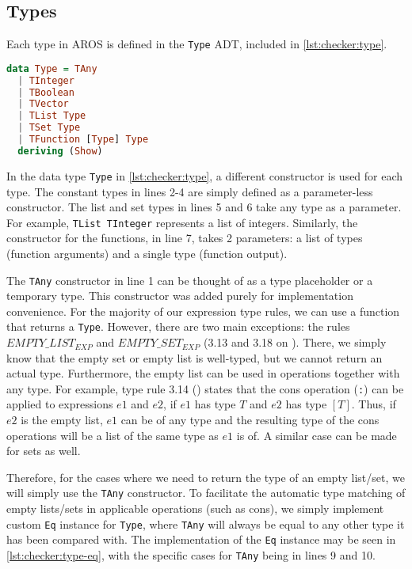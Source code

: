 \subsection{Types}
\label{sec:checker:types}
Each type in AROS is defined in the \lstinline{Type} ADT, included in \cref{lst:checker:type}. 
\begin{lstlisting}[language=haskell,
caption={Data type used to represent types during type checking},
label=lst:checker:type]
data Type = TAny
  | TInteger
  | TBoolean
  | TVector
  | TList Type
  | TSet Type
  | TFunction [Type] Type
  deriving (Show)
\end{lstlisting}
\par In the data type \lstinline{Type} in \cref{lst:checker:type}, a different constructor is used for each type. The constant types in lines 2-4 are simply defined as a parameter-less constructor. The list and set types in lines 5 and 6 take any type as a parameter. For example, \lstinline{TList TInteger} represents a list of integers. Similarly, the constructor for the functions, in line 7, takes 2 parameters: a list of types (function arguments) and a single type (function output).
\par The \lstinline{TAny} constructor in line 1 can be thought of as a type placeholder or a temporary type. This constructor was added purely for implementation convenience. For the majority of our expression type rules, we can use a function that returns a \lstinline{Type}. However, there are two main exceptions: the rules $EMPTY\_LIST_{EXP}$ and $EMPTY\_SET_{EXP}$ (3.13 and 3.18 on ). There, we simply know that the empty set or empty list is well-typed, but we cannot return an actual type. Furthermore, the empty list can be used in operations together with any type. For example, type rule 3.14 () states that the cons operation (\lstinline{:}) can be applied to expressions $e1$ and $e2$, if $e1$ has type $T$ and $e2$ has type $[T]$. Thus, if $e2$ is the empty list, $e1$ can be of any type and the resulting type of the cons operations will be a list of the same type as $e1$ is of. A similar case can be made for sets as well. 
\par Therefore, for the cases where we need to return the type of an empty list/set, we will simply use the \lstinline{TAny} constructor. To facilitate the automatic type matching of empty lists/sets in applicable operations (such as cons), we simply implement custom \lstinline{Eq} instance for \lstinline{Type}, where \lstinline{TAny} will always be equal to any other type it has been compared with. The implementation of the \lstinline{Eq} instance may be seen in \cref{lst:checker:type-eq}, with the specific cases for \lstinline{TAny} being in lines 9 and 10. 
